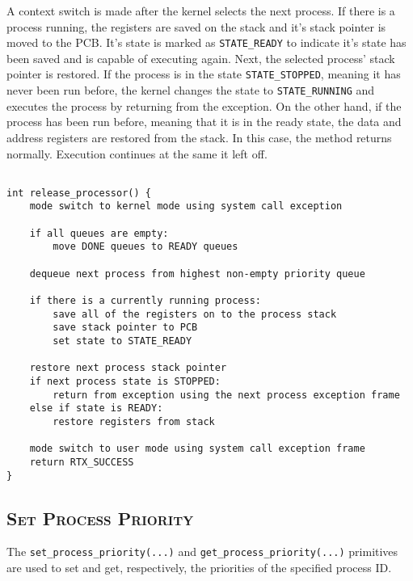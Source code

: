 \documentclass[oneside]{report}
\begin{document}
A context switch is made after the kernel selects the next process. If there is
a process running, the registers are saved on the stack and it's stack pointer
is moved to the PCB. It's state is marked as \texttt{STATE\_READY} to indicate
it's state has been saved and is capable of executing again. Next, the selected
process' stack pointer is restored. If the process is in the state
\texttt{STATE\_STOPPED}, meaning it has never been run before, the kernel
changes the state to \texttt{STATE\_RUNNING} and executes the process by
returning from the exception. On the other hand, if the process has been run
before, meaning that it is in the ready state, the data and address registers
are restored from the stack. In this case, the method returns normally.
Execution continues at the same it left off.

\begin{lstlisting}

int release_processor() {
    mode switch to kernel mode using system call exception

    if all queues are empty:
        move DONE queues to READY queues

    dequeue next process from highest non-empty priority queue

    if there is a currently running process:
        save all of the registers on to the process stack
        save stack pointer to PCB
        set state to STATE_READY

    restore next process stack pointer
    if next process state is STOPPED:
        return from exception using the next process exception frame
    else if state is READY: 
        restore registers from stack
    
    mode switch to user mode using system call exception frame
    return RTX_SUCCESS
}
\end{lstlisting}

\subsection{\textsc{Set Process Priority}}
The \texttt{set\_process\_priority(...)} and \texttt{get\_process\_priority(...)}
primitives are used to set and get, respectively, the priorities of the 
specified process ID. 
\end{document}
